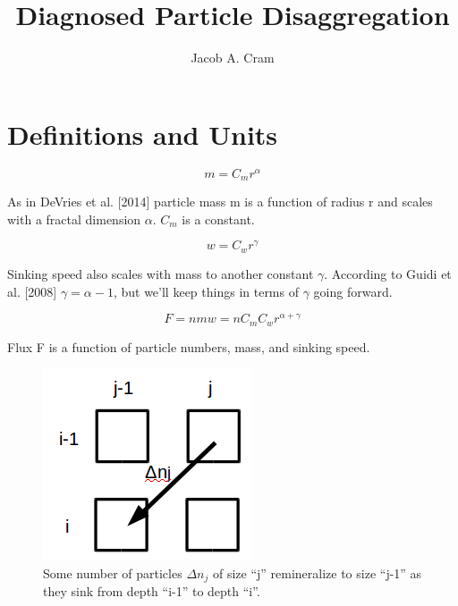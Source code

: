 \documentclass[a4paper,12pt]{article}
\newcommand\addtag{\refstepcounter{equation}\tag{\theequation}}
\begin{document}
\title{Diagnosed Particle Disaggregation}
\author{Jacob A. Cram}
\maketitle

\section{Definitions and Units}

\begin{equation}
  m = C_m r^\alpha %
  \label{eqn:m}
\end{equation}

As in DeVries et al. [2014] particle mass m is a function of radius r and scales with a fractal dimension $\alpha$. $C_m$ is a constant.

\begin{equation}
  w = C_wr^\gamma %
  \label{eqn:w}
\end{equation}

Sinking speed also scales with mass to another constant $\gamma$. 
According to Guidi et al. [2008] $\gamma = \alpha - 1$, but we'll keep things in terms of $\gamma$ going forward.

\begin{equation}
  F = nmw = n C_m C_w r^{\alpha + \gamma}
\end{equation}

Flux F is a function of particle numbers, mass, and sinking speed.


\begin{figure}[h]

  \includegraphics[natwidth=0.35\textwidth]{ijFig2.png}
  
  \centering
  \caption{Some number of particles $\Delta n_j$ of size ``j'' remineralize to size ``j-1'' as they sink from depth ``i-1'' to depth ``i''.}
  \label{fig:boxes}
\end{figure}
\end{document}
